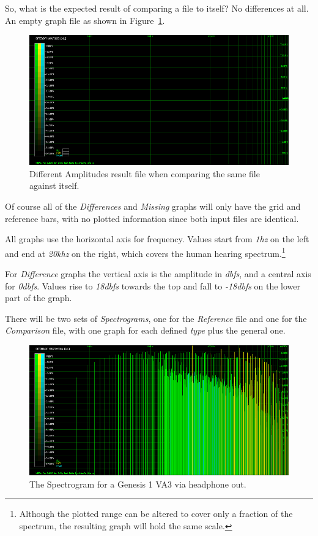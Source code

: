 \documentclass[10pt,a4paper]{report}
\newcommand{\ac}[1]{\textit{\mbox{\acrshort{#1}}}}
\newcommand{\hz}[1]{\textit{\mbox{#1\acrshort{hz}}}}
\newcommand{\khz}[1]{\textit{\mbox{#1\acrshort{khz}}}}
\newcommand{\db}[1]{\textit{\mbox{#1\acrshort{dbfs}}}}
\begin{document}
So, what is the expected result of comparing a file to itself? No differences at all. An empty graph file as shown in Figure~\ref{fig:plot1-samefile}.

\begin{figure}[H]
	\centering
	\includegraphics[width=1.0\linewidth]{images/interpretation/Plot1-SameFile.png}
	\caption[Same file compared]{Different Amplitudes result file when comparing the same file against itself.}
	\label{fig:plot1-samefile}
\end{figure}

Of course all of the \textit{Differences} and \textit{Missing} graphs will only have the grid and reference bars, with no plotted information since both input files are identical.

All graphs use the horizontal axis for frequency. Values start from \hz{1} on the left and end at  \khz{20} on the right, which covers the human hearing spectrum.\footnote{Although the plotted range can be altered to cover only a fraction of the spectrum, the resulting graph will hold the same scale.}

For \textit{Difference} graphs the vertical axis is the amplitude in \ac{dbfs}, and a central axis for \db{0}. Values rise to \db{18} towards the top and fall to \db{-18} on the lower part of the graph.

There will be two sets of \textit{Spectrograms}, one for the \textit{Reference} file and one for the \textit{Comparison} file, with one graph for each defined \textit{type} plus the general one.

\begin{figure}[H]
	\centering
	\includegraphics[width=1.0\linewidth]{images/interpretation/Plot1-SameFile-Spectrogram.png}
	\caption[Spectrogram]{The Spectrogram for a Genesis 1 VA3 via headphone out.}
	\label{fig:plot2-samefile-fm-spectrogram}
\end{figure}
\end{document}
